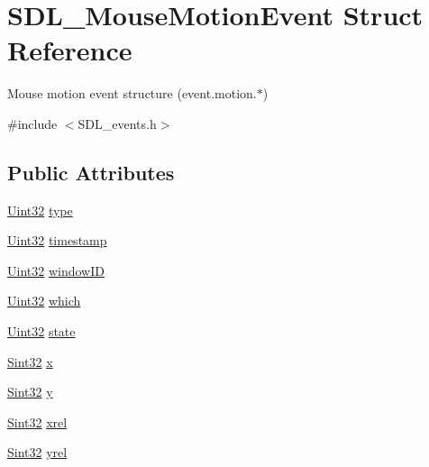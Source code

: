 \hypertarget{struct_s_d_l___mouse_motion_event}{}\section{S\+D\+L\+\_\+\+Mouse\+Motion\+Event Struct Reference}
\label{struct_s_d_l___mouse_motion_event}


Mouse motion event structure (event.\+motion.$\ast$)  




{\ttfamily \#include $<$S\+D\+L\+\_\+events.\+h$>$}

\subsection*{Public Attributes}
\begin{DoxyCompactItemize}
\item 
\mbox{\hyperlink{_s_d_l__stdinc_8h_add440eff171ea5f55cb00c4a9ab8672d}{Uint32}} \mbox{\hyperlink{struct_s_d_l___mouse_motion_event_a431dd28cd6db6a7335cf633dbeb80cfb}{type}}
\item 
\mbox{\hyperlink{_s_d_l__stdinc_8h_add440eff171ea5f55cb00c4a9ab8672d}{Uint32}} \mbox{\hyperlink{struct_s_d_l___mouse_motion_event_af530bc0ef327ea6d497c5b1da119841c}{timestamp}}
\item 
\mbox{\hyperlink{_s_d_l__stdinc_8h_add440eff171ea5f55cb00c4a9ab8672d}{Uint32}} \mbox{\hyperlink{struct_s_d_l___mouse_motion_event_aa9976725242ada93a9e18e7fdf5796e6}{window\+ID}}
\item 
\mbox{\hyperlink{_s_d_l__stdinc_8h_add440eff171ea5f55cb00c4a9ab8672d}{Uint32}} \mbox{\hyperlink{struct_s_d_l___mouse_motion_event_a6f04c17b4305683915e2fd2dc3c36dbc}{which}}
\item 
\mbox{\hyperlink{_s_d_l__stdinc_8h_add440eff171ea5f55cb00c4a9ab8672d}{Uint32}} \mbox{\hyperlink{struct_s_d_l___mouse_motion_event_a3f6e9bad9d959b824881ba09e05b7024}{state}}
\item 
\mbox{\hyperlink{_s_d_l__stdinc_8h_a7a90b941db9d4582e9ad7abb9940ff7e}{Sint32}} \mbox{\hyperlink{struct_s_d_l___mouse_motion_event_a36398bb4a5308446a262b0bfc8baa80a}{x}}
\item 
\mbox{\hyperlink{_s_d_l__stdinc_8h_a7a90b941db9d4582e9ad7abb9940ff7e}{Sint32}} \mbox{\hyperlink{struct_s_d_l___mouse_motion_event_a7e6a7b1f8713d1968dc913908e8ea448}{y}}
\item 
\mbox{\hyperlink{_s_d_l__stdinc_8h_a7a90b941db9d4582e9ad7abb9940ff7e}{Sint32}} \mbox{\hyperlink{struct_s_d_l___mouse_motion_event_a1c01d9aba2a20778fb45a15dca39ef58}{xrel}}
\item 
\mbox{\hyperlink{_s_d_l__stdinc_8h_a7a90b941db9d4582e9ad7abb9940ff7e}{Sint32}} \mbox{\hyperlink{struct_s_d_l___mouse_motion_event_a7674c8b92d039ab948f671a180fa7b30}{yrel}}
\end{DoxyCompactItemize}


